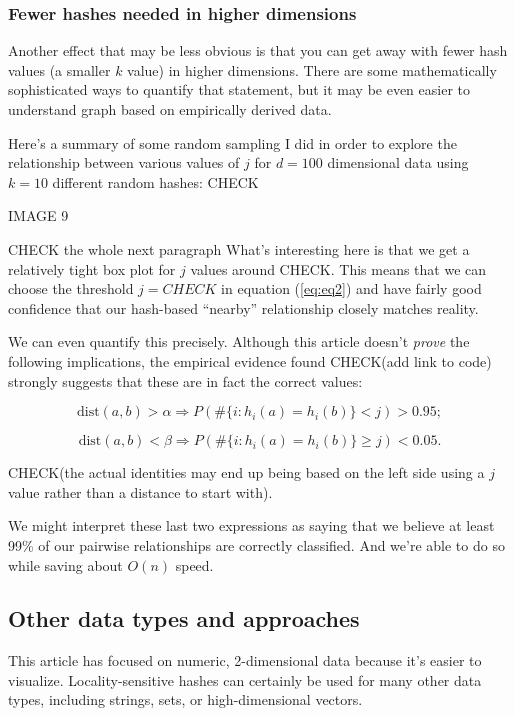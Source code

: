 \documentclass[20pt,]{extarticle}
\begin{document}
\subsubsection{Fewer hashes needed in higher
dimensions}\label{fewer-hashes-needed-in-higher-dimensions}

Another effect that may be less obvious is that you can get away with
fewer hash values (a smaller \(k\) value) in higher dimensions. There
are some mathematically sophisticated ways to quantify that statement,
but it may be even easier to understand graph based on empirically
derived data.

Here's a summary of some random sampling I did in order to explore the
relationship between various values of \(j\) for \(d=100\) dimensional
data using \(k=10\) different random hashes: CHECK

IMAGE 9

CHECK the whole next paragraph What's interesting here is that we get a
relatively tight box plot for \(j\) values around CHECK. This means that
we can choose the threshold \(j=CHECK\) in equation (\ref{eq:eq2}) and
have fairly good confidence that our hash-based ``nearby'' relationship
closely matches reality.

We can even quantify this precisely. Although this article doesn't
\emph{prove} the following implications, the empirical evidence found
CHECK(add link to code) strongly suggests that these are in fact the
correct values:

\[ \text{dist}(a, b) > \alpha \Rightarrow P(\#\{i : h_i(a) = h_i(b)\} < j) > 0.95; \]

\[ \text{dist}(a, b) < \beta  \Rightarrow P(\#\{i : h_i(a) = h_i(b)\} \ge j) < 0.05. \]

CHECK(the actual identities may end up being based on the left side
using a \(j\) value rather than a distance to start with).

We might interpret these last two expressions as saying that we believe
at least 99\% of our pairwise relationships are correctly classified.
And we're able to do so while saving about \(O(n)\) speed.

\subsection{Other data types and
approaches}\label{other-data-types-and-approaches}

This article has focused on numeric, 2-dimensional data because it's
easier to visualize. Locality-sensitive hashes can certainly be used for
many other data types, including strings, sets, or high-dimensional
vectors.
\end{document}
